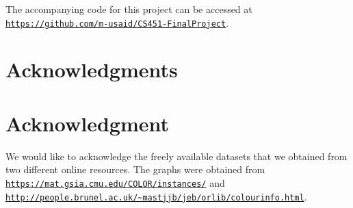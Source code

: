 \documentclass[conference,compsoc]{IEEEtran}
\begin{document}
The accompanying code for this project can be accessed at \texttt{\url{https://github.com/m-usaid/CS451-FinalProject}}. 

\ifCLASSOPTIONcompsoc
\section*{Acknowledgments}
\else
  \section*{Acknowledgment}
\fi

We would like to acknowledge the freely available datasets that we obtained from two different online resources. The graphs 
were obtained from \texttt{\url{https://mat.gsia.cmu.edu/COLOR/instances/}} and 
\texttt{\url{http://people.brunel.ac.uk/~mastjjb/jeb/orlib/colourinfo.html}}.



\end{document}
